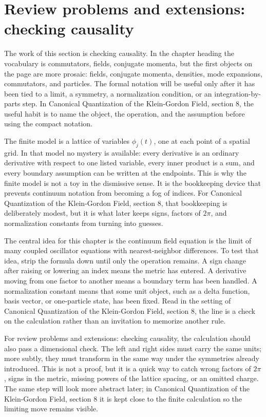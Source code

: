 \section{Review problems and extensions: checking causality}

The work of this section is checking causality.  In the chapter heading the vocabulary is commutators, fields, conjugate momenta, but the first objects on the page are more prosaic: fields, conjugate momenta, densities, mode expansions, commutators, and particles.  The formal notation will be useful only after it has been tied to a limit, a symmetry, a normalization condition, or an integration-by-parts step.  In Canonical Quantization of the Klein-Gordon Field, section 8, the useful habit is to name the object, the operation, and the assumption before using the compact notation.

The finite model is a lattice of variables \(\phi_j(t)\), one at each point of a spatial grid.  In that model no mystery is available: every derivative is an ordinary derivative with respect to one listed variable, every inner product is a sum, and every boundary assumption can be written at the endpoints.  This is why the finite model is not a toy in the dismissive sense.  It is the bookkeeping device that prevents continuum notation from becoming a fog of indices.  For Canonical Quantization of the Klein-Gordon Field, section 8, that bookkeeping is deliberately modest, but it is what later keeps signs, factors of \(2\pi\), and normalization constants from turning into guesses.

The central idea for this chapter is the continuum field equation is the limit of many coupled oscillator equations with nearest-neighbor differences.  To test that idea, strip the formula down until only the operation remains.  A sign change after raising or lowering an index means the metric has entered.  A derivative moving from one factor to another means a boundary term has been handled.  A normalization constant means that some unit object, such as a delta function, basis vector, or one-particle state, has been fixed.  Read in the setting of Canonical Quantization of the Klein-Gordon Field, section 8, the line is a check on the calculation rather than an invitation to memorize another rule.

For review problems and extensions: checking causality, the calculation should also pass a dimensional check.  The left and right sides must carry the same units; more subtly, they must transform in the same way under the symmetries already introduced.  This is not a proof, but it is a quick way to catch wrong factors of \(2\pi\), signs in the metric, missing powers of the lattice spacing, or an omitted charge.  The same step will look more abstract later; in Canonical Quantization of the Klein-Gordon Field, section 8 it is kept close to the finite calculation so the limiting move remains visible.


